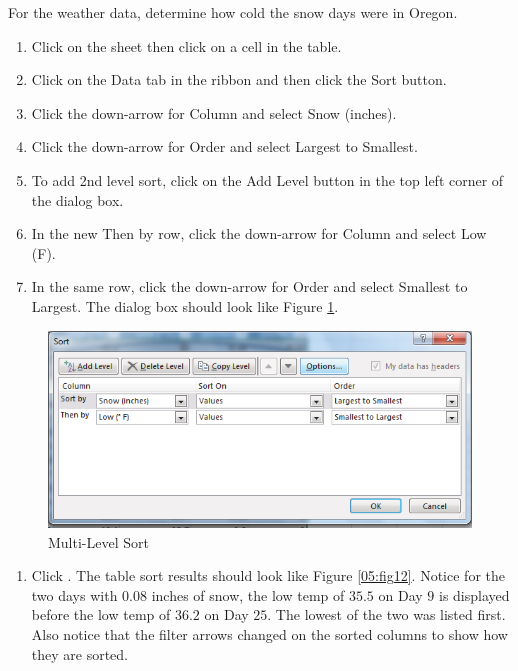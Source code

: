For the weather data, determine how cold the snow days were in Oregon.

\begin{enumerate}
	\item Click on the  sheet then click on a cell in the table.
	\item Click on the Data tab in the ribbon and then click the Sort button.
	\item Click the down-arrow for Column and select Snow (inches).
	\item Click the down-arrow for Order and select Largest to Smallest.
	\item To add 2nd level sort, click on the Add Level button in the top left corner of the dialog box.
	\item In the new Then by row, click the down-arrow for Column and select Low (\textdegree F).
	\item In the same row, click the down-arrow for Order and select Smallest to Largest. The dialog box should look like Figure \ref{05:fig11}.
\end{enumerate}

\begin{figure}[H]
	\centering
	\includegraphics[width=\maxwidth{.95\linewidth}]{gfx/ch05_fig11}
	\caption{Multi-Level Sort}
	\label{05:fig11}
\end{figure}

\begin{enumerate}[resume]
	\item Click . The table sort results should look like Figure \ref{05:fig12}. Notice for the two days with $ 0.08 $ inches of snow, the low temp of $ 35.5 $ on Day $ 9 $ is displayed before the low temp of $ 36.2 $ on Day $ 25 $. The lowest of the two was listed first. Also notice that the filter arrows changed on the sorted columns to show how they are sorted.
\end{enumerate}

